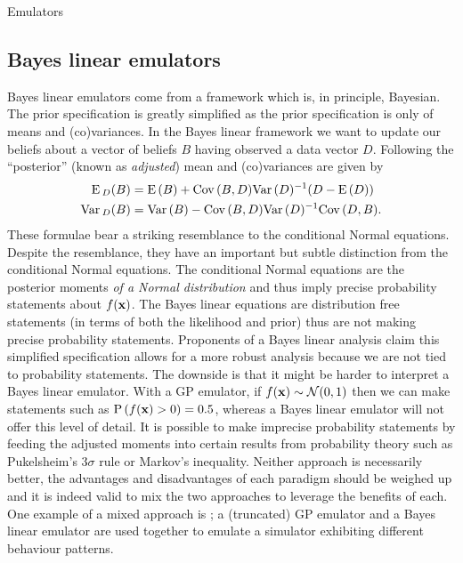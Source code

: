 \begin{chapter}{Emulators \label{Ch:Emulators}}
\subsection{Bayes linear emulators}
Bayes linear emulators \citep{Jones2016, Wilson18, Bower2010, Vernon2019, Jackson2023} come from a framework which is, in principle, Bayesian. The prior specification is greatly simplified as the prior specification is only of means and (co)variances. In the Bayes linear framework we want to update our beliefs about a vector of beliefs $B$ having observed a data vector $D$. Following \citet{BLS07} the ``posterior'' (known as \textit{adjusted}) mean and (co)variances are given by
\begin{align}
  \textrm{E}\,_{D}(B) &= \textrm{E}\,(B) + \mathrm{Cov}\,(B, D) \mathrm{Var}\,(D)^{-1}(D - \textrm{E}\,(D)) \label{Eq:bl-mean}\\
  \mathrm{Var}\,_{D}(B) & = \mathrm{Var}\,(B) - \mathrm{Cov}\,(B, D) \mathrm{Var}\,(D)^{-1} \mathrm{Cov}\,(D, B) \label{Eq:bl-var}.
\end{align}
These formulae bear a striking resemblance to the conditional Normal equations. Despite the resemblance, they have an important but subtle distinction from the conditional Normal equations. The conditional Normal equations are the posterior moments \textit{of a Normal distribution} and thus imply precise probability statements about $f(\mathbf{x})$. The Bayes linear equations are distribution free statements (in terms of both the likelihood and prior) thus are not making precise probability statements. Proponents of a Bayes linear analysis claim this simplified specification allows for a more robust analysis because we are not tied to probability statements. The downside is that it might be harder to interpret a Bayes linear emulator. With a GP emulator, if $f(\mathbf{x}) \sim \mathcal{N}(0, 1)$ then we can make statements such as $\mathrm{P}\, (f(\mathbf{x})>0) = 0.5$, whereas a Bayes linear emulator will not offer this level of detail. It is possible to make imprecise probability statements by feeding the adjusted moments into certain results from probability theory such as Pukelsheim's $3\sigma$ rule \citep{Pukelsheim1994} or Markov's inequality. Neither approach is necessarily better, the advantages and disadvantages of each paradigm should be weighed up and it is indeed valid to mix the two approaches to leverage the benefits of each. One example of a mixed approach is \citet{Owen2020}; a (truncated) GP emulator and a Bayes linear emulator are used together to emulate a simulator exhibiting different behaviour patterns.


\end{chapter}
